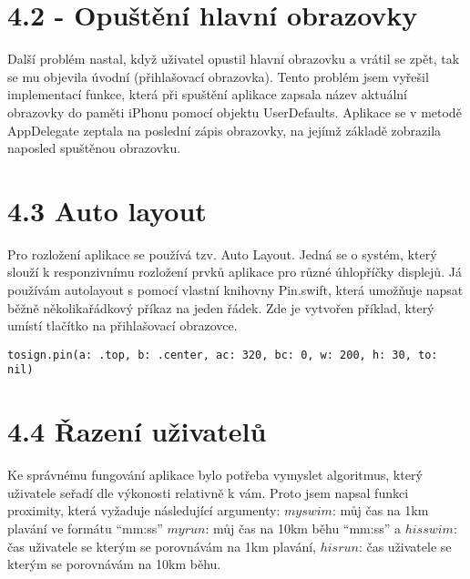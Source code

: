 \documentclass{article}
\begin{document}
\vspace{10 mm}
\section*{4.2 - Opuštění hlavní obrazovky}

Další problém nastal, když uživatel opustil hlavní obrazovku a vrátil se zpět, tak se mu objevila úvodní (přihlašovací obrazovka). Tento problém jsem vyřešil implementací funkce, která při spuštění aplikace zapsala název aktuální obrazovky do paměti iPhonu pomocí objektu UserDefaults. Aplikace se v metodě AppDelegate zeptala na poslední zápis obrazovky, na jejímž základě zobrazila naposled spuštěnou obrazovku.


\vspace{10 mm}
\section*{4.3 Auto layout}

Pro rozložení aplikace se používá tzv. Auto Layout. Jedná se o systém, který slouží k responzivnímu rozložení prvků aplikace pro různé úhlopříčky displejů. 
Já používám autolayout s pomocí vlastní knihovny Pin.swift, která umožňuje napsat běžně několikařádkový příkaz na jeden řádek. Zde je vytvořen příklad, který umístí tlačítko na přihlašovací obrazovce.



\vspace{10 mm}
\begin{verbatim}
tosign.pin(a: .top, b: .center, ac: 320, bc: 0, w: 200, h: 30, to: nil)
\end{verbatim}


\vspace{10 mm}
\section*{4.4 Řazení uživatelů}

Ke správnému fungování aplikace bylo potřeba vymyslet algoritmus, který uživatele seřadí dle výkonosti relativně k vám. Proto jsem napsal funkci proximity, která vyžaduje následující argumenty: 
$myswim$: můj čas na 1km plavání ve formátu “mm:ss”
$myrun$: můj čas na 10km běhu “mm:ss” a $hisswim$: čas uživatele se kterým se porovnávám na 1km plavání,  $hisrun$: čas uživatele se kterým se porovnávám na 10km běhu.
\end{document}
